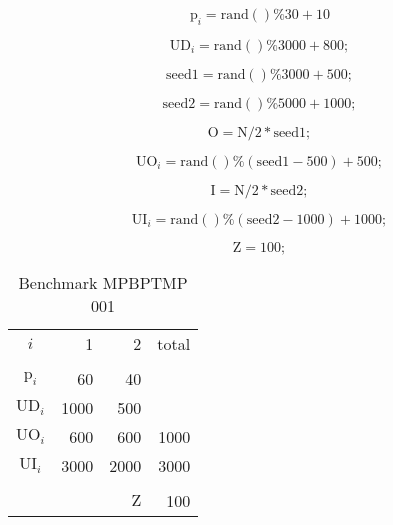 \documentclass[authoryear,preprint,12pt]{elsarticle}
\begin{document}
\begin{equation}
\textrm{p}_i = \textrm{rand}()\%30 + 10
\end{equation}

\begin{equation}
\textrm{UD}_i = \textrm{rand}()\%3000 + 800;
\end{equation}

\begin{equation}
 \textrm{seed1} = \textrm{rand}()\%3000 + 500;
\end{equation}

\begin{equation}
\textrm{seed2} = \textrm{rand}()\%5000 + 1000;
\end{equation}

\begin{equation}
\textrm{O} = \textrm{N}/2*\textrm{seed1};
\end{equation}

\begin{equation}
\textrm{UO}_i = \textrm{rand}()\%(\textrm{seed1}-500) + 500;
\end{equation}

\begin{equation}
\textrm{I} = \textrm{N}/2*\textrm{seed2};
\end{equation}

\begin{equation}
\textrm{UI}_i = \textrm{rand}()\%(\textrm{seed2}-1000) + 1000;
\end{equation}

\begin{equation}
\textrm{Z} = 100;
\end{equation}


\begin{table}[h]
\begin{center}
\begin{tabular}[c]{c r r r}
$i$ & 1 & 2 & total \\
\cline {1-4} \\
$\textrm{p}_i$ & 60 & 40 & \\
$\textrm{UD}_i$ & 1000 & 500 & \\
$\textrm{UO}_i$ & 600 & 600 & 1000 \\
$\textrm{UI}_i$ & 3000 & 2000 & 3000 \\
\cline {1-4} \\
& & $\textrm{Z}$ & 100 \\
\end{tabular}
\caption{Benchmark MPBPTMP 001}
\label{tab:MBPTMP001}
\end{center}
\end{table}
\end{document}
